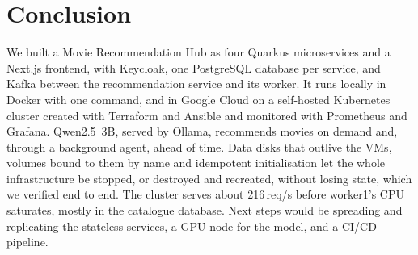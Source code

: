 \section{Conclusion}\label{sec:conclusion}

We built a Movie Recommendation Hub as four Quarkus microservices and a Next.js frontend, with Keycloak, one PostgreSQL database per service, and Kafka between the recommendation service and its worker. It runs locally in Docker with one command, and in Google Cloud on a self-hosted Kubernetes cluster created with Terraform and Ansible and monitored with Prometheus and Grafana. Qwen2.5~3B, served by Ollama, recommends movies on demand and, through a background agent, ahead of time. Data disks that outlive the VMs, volumes bound to them by name and idempotent initialisation let the whole infrastructure be stopped, or destroyed and recreated, without losing state, which we verified end to end. The cluster serves about 216\,req/s before worker1's CPU saturates, mostly in the catalogue database. Next steps would be spreading and replicating the stateless services, a GPU node for the model, and a CI/CD pipeline.
